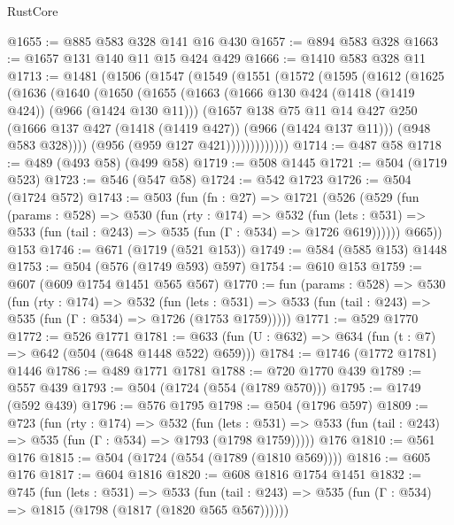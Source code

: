 \begin{lexlean}{RustCore}
\begin{coremodule}
{\begin{coremodule}
{{{{{{{@1655 := @885 @583 @328 @141 @16 @430
@1657 := @894 @583 @328
@1663 := @1657 @131 @140 @11 @15 @424 @429
@1666 := @1410 @583 @328 @11
@1713 := @1481
    (@1506
      (@1547
        (@1549
          (@1551
            (@1572
              (@1595
                (@1612
                  (@1625
                    (@1636
                      (@1640
                        (@1650
                          (@1655
                            (@1663
                              (@1666 @130 @424 (@1418 (@1419 @424)) (@966 (@1424 @130 @11)))
                              (@1657
                                @138
                                @75
                                @11
                                @14
                                @427
                                @250
                                (@1666 @137 @427 (@1418 (@1419 @427)) (@966 (@1424 @137 @11)))
                                (@948 @583 @328))))
                          (@956 (@959 @127 @421)))))))))))))
@1714 := @487 @58
@1718 := @489 (@493 @58) (@499 @58)
@1719 := @508 @1445
@1721 := @504 (@1719 @523)
@1723 := @546 (@547 @58)
@1724 := @542 @1723
@1726 := @504 (@1724 @572)
@1743 := @503
    (fun (fn : @27) =>
    @1721
      (@526
        (@529
          (fun (params : @528) =>
          @530
            (fun (rty : @174) =>
            @532
              (fun (lets : @531) =>
              @533 (fun (tail : @243) => @535 (fun (Γ : @534) => @1726 @619))))))
        @665))
    @153
@1746 := @671 (@1719 (@521 @153))
@1749 := @584 (@585 @153) @1448
@1753 := @504 (@576 (@1749 @593) @597)
@1754 := @610 @153
@1759 := @607 (@609 @1754 @1451 @565 @567)
@1770 := fun (params : @528) =>
  @530
    (fun (rty : @174) =>
    @532
      (fun (lets : @531) =>
      @533 (fun (tail : @243) => @535 (fun (Γ : @534) => @1726 (@1753 @1759)))))
@1771 := @529 @1770
@1772 := @526 @1771
@1781 := @633 (fun (U : @632) => @634 (fun (t : @7) => @642 (@504 (@648 @1448 @522) @659)))
@1784 := @1746 (@1772 @1781) @1446
@1786 := @489 @1771 @1781
@1788 := @720 @1770 @439
@1789 := @557 @439
@1793 := @504 (@1724 (@554 (@1789 @570)))
@1795 := @1749 (@592 @439)
@1796 := @576 @1795
@1798 := @504 (@1796 @597)
@1809 := @723
    (fun (rty : @174) =>
    @532
      (fun (lets : @531) =>
      @533 (fun (tail : @243) => @535 (fun (Γ : @534) => @1793 (@1798 @1759)))))
    @176
@1810 := @561 @176
@1815 := @504 (@1724 (@554 (@1789 (@1810 @569))))
@1816 := @605 @176
@1817 := @604 @1816
@1820 := @608 @1816 @1754 @1451
@1832 := @745
    (fun (lets : @531) =>
    @533 (fun (tail : @243) => @535 (fun (Γ : @534) => @1815 (@1798 (@1817 (@1820 @565 @567))))))
}}}}}}}
\end{coremodule}}
\end{coremodule}
\end{lexlean}
